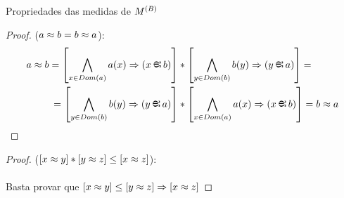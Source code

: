 \begin{proposition}{Propriedades das medidas de $M^{(B)}$}
\begin{proof}
            ($a\approx b = b \approx a$):
            \begin{align*}
                a\Meq b = \left[\bigwedge_{x\in Dom(a)}a(x)\RAR (x\Min b)\right]&*\left[\bigwedge_{y\in Dom(b)}b(y)\RAR (y\Min a)\right] =\\
                =\left[\bigwedge_{y\in Dom(b)}b(y)\RAR (y\Min a)\right]&*\left[\bigwedge_{x\in Dom(a)}a(x)\RAR (x\Min b)\right] = b\Meq a
            \end{align*}\eop
        \end{proof}
        \begin{proof}
            
            ($[x\approx y] * [y\approx z] \leq [x\approx z]$):
            \paragraph{}
                Basta provar que $[x\approx y] \leq [y\approx z] \Rightarrow [x\approx z]$
        \end{proof}
    \end{proposition}